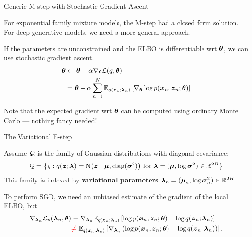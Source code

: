 \documentclass[aspectratio=169]{beamer}
\begin{document}
\begin{frame}[t,allowframebreaks]{Generic M-step with Stochastic Gradient
Ascent}\label{generic-m-step-with-stochastic-gradient-ascent}

For exponential family mixture models, the M-step had a closed form
solution. For deep generative models, we need a more general approach.

If the parameters are unconstrained and the ELBO is differentiable wrt
\(\boldsymbol{\theta}\), we can use stochastic gradient ascent. \begin{align*}
    \boldsymbol{\theta} &\leftarrow \boldsymbol{\theta} + \alpha \nabla_{\boldsymbol{\theta}} \mathcal{L}(q, \boldsymbol{\theta}) \\
    &= \boldsymbol{\theta} + \alpha \sum_{n=1}^N \mathbb{E}_{q(\boldsymbol{z}_n; \boldsymbol{\lambda}_n)} \left[ \nabla_{\boldsymbol{\theta}} \log p(\boldsymbol{x}_n, \boldsymbol{z}_n; \boldsymbol{\theta}) \right]
\end{align*}

Note that the expected gradient wrt \(\boldsymbol{\theta}\) can be computed using
ordinary Monte Carlo --- nothing fancy needed!
\end{frame}

\begin{frame}[t,allowframebreaks]{The Variational E-step}\label{the-variational-e-step}

Assume \(\mathcal{Q}\) is the family of Gaussian distributions with diagonal
covariance: 
\begin{align*}
    \mathcal{Q} = \left\{q: q(\boldsymbol{z}; \boldsymbol{\lambda}) = \mathrm{N}\big(\boldsymbol{z} ~\vert~ \boldsymbol{\mu}, \textrm{diag}(\boldsymbol{\sigma}^2)\big) \text{ for } \boldsymbol{\lambda} = (\boldsymbol{\mu}, \log \boldsymbol{\sigma}^2) \in \mathbb{R}^{2H} \right\}
\end{align*} 
This family is indexed by \textbf{variational parameters}
\(\boldsymbol{\lambda}_n = (\boldsymbol{\mu}_n, \log \boldsymbol{\sigma}_n^2) \in \mathbb{R}^{2H}\).

To perform SGD, we need an unbiased estimate of the gradient of the
local ELBO, but \begin{align*}
\nabla_{\boldsymbol{\lambda}_n} \mathcal{L}_n(\boldsymbol{\lambda}_n, \boldsymbol{\theta}) 
&= \nabla_{\boldsymbol{\lambda}_n} \mathbb{E}_{q(\boldsymbol{z}_n; \boldsymbol{\lambda}_n)} \left[ \log p(\boldsymbol{x}_n, \boldsymbol{z}_n; \boldsymbol{\theta}) - \log q(\boldsymbol{z}_n; \boldsymbol{\lambda}_n) \right] \\
&\textcolor{red}{\neq} \;  \mathbb{E}_{q(\boldsymbol{z}_n; \boldsymbol{\lambda}_n)} \left[ \nabla_{\boldsymbol{\lambda}_n} \left(\log p(\boldsymbol{x}_n, \boldsymbol{z}_n; \boldsymbol{\theta}) - \log q(\boldsymbol{z}_n; \boldsymbol{\lambda}_n)\right) \right].
\end{align*}
\end{frame}
\end{document}
